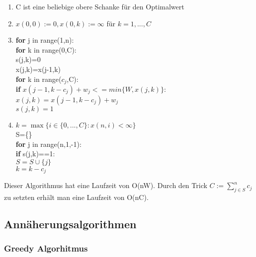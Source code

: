\documentclass[12pt, a4paper, ngerman]{article}
\begin{document}
\begin{enumerate}
\item C ist eine beliebige obere Schanke für den Optimalwert
\item \(x(0,0):=0, x(0,k):=\infty\) für \(k=1,...,C\)
\item \textbf{for} j in range(1,n):\\
  \hspace*{5mm}\textbf{for} k in range(0,C):\\
  \hspace*{10mm}s(j,k)=0\\
  \hspace*{10mm}x(j,k)=x(j-1,k)\\
  \hspace*{5mm}\textbf{for} k in range(\(c_j\),C):\\
  \hspace*{10mm}\textbf{if} \(x(j-1,k-c_j)+w_j <= min\{W,x(j,k)\}:\)\\
  \hspace*{15mm}\(x(j,k)=x(j-1,k-c_j)+w_j\)\\
  \hspace*{15mm}\(s(j,k)=1\)\\
\item \(k=\max\{i \in \{0,...,C\}:x(n,i)<\infty\}\)\\
  S=\{\}\\
  \textbf{for} j in range(n,1,-1):\\
  \hspace*{5mm}\textbf{if} s(j,k)==1:\\
  \hspace*{10mm}\(S=S \cup \{j\}\)\\
  \hspace*{10mm}\(k=k-c_j\)
\end{enumerate}

Dieser Algorithmus hat eine Laufzeit von O(nW). Durch den Trick \(C:=\sum_{j\in S}^nc_j\) zu setzten erhält man eine Laufzeit von O(nC).

\cite[Kap. 17]{KombinatorischeOptimierung}
\FloatBarrier

\subsection{Annäherungsalgorithmen}


\subsubsection{Greedy Algorhitmus}
\end{document}
